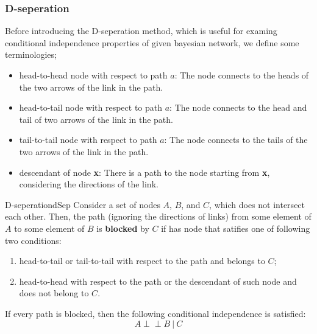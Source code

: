 \documentclass{article}
\newcommand{\indep}{\perp \!\!\! \perp}
\begin{document}
        \subsubsection{D-seperation}
            Before introducing the D-seperation method, which is useful for examing conditional independence properties of given
            bayesian network, we define some terminologies;
            \begin{itemize}
                \item head-to-head node with respect to path $a$: The node connects to the heads of the two arrows of the link in the path. 
                \item head-to-tail node with respect to path $a$: The node connects to the head and tail of two arrows of the link in the path.
                \item tail-to-tail node with respect to path $a$: The node connects to the tails of the two arrows of the link in the path.
                \item descendant of node \textbf{x}: There is a path to the node starting from \textbf{x}, considering the directions of the link.
            \end{itemize}

            \begin{thm}{D-seperation}{dSep}
                Consider a set of nodes $A$, $B$, and $C$, which does not intersect each other.
                Then, the path (ignoring the directions of links) from some element of $A$ to some element of $B$
                is \textbf{blocked} by $C$ if has node that satifies one of following two conditions:
                \begin{enumerate}
                    \item head-to-tail or tail-to-tail with respect to the path and belongs to $C$;
                    \item head-to-head with respect to the path or the descendant of such node and does not belong to $C$.  
                \end{enumerate}
                If every path is blocked, then the following conditional independence is satisfied:
                \[
                A \indep B\ | \ C
                \]
            \end{thm}
\end{document}
